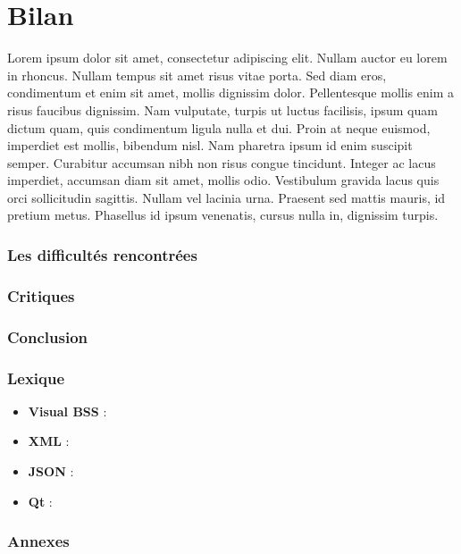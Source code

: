 \documentclass[12pt]{article}
\begin{document}
\part{Bilan}
Lorem ipsum dolor sit amet, consectetur adipiscing elit. Nullam auctor eu lorem in rhoncus. Nullam tempus sit amet risus vitae porta. Sed diam eros, condimentum et enim sit amet, mollis dignissim dolor. Pellentesque mollis enim a risus faucibus dignissim. Nam vulputate, turpis ut luctus facilisis, ipsum quam dictum quam, quis condimentum ligula nulla et dui. Proin at neque euismod, imperdiet est mollis, bibendum nisl. Nam pharetra ipsum id enim suscipit semper. Curabitur accumsan nibh non risus congue tincidunt. Integer ac lacus imperdiet, accumsan diam sit amet, mollis odio. Vestibulum gravida lacus quis orci sollicitudin sagittis. Nullam vel lacinia urna. Praesent sed mattis mauris, id pretium metus. Phasellus id ipsum venenatis, cursus nulla in, dignissim turpis.
	\section{Les difficultés rencontrées}
	\section{Critiques}
	\section{Conclusion}

	\section{Lexique}
	\begin{itemize}
		\item[]\textbf{Visual BSS} :
		\item[]\textbf{XML} :
		\item[]\textbf{JSON} :
		\item[]\textbf{Qt} :
	\end{itemize}



	\section{Annexes}


 
\end{document}
